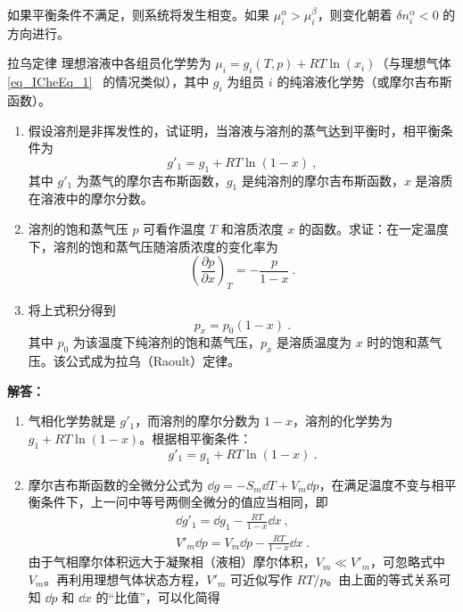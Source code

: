 如果平衡条件不满足，则系统将发生相变。如果 $\mu_i^\alpha>\mu_i^\beta$，则变化朝着 $\delta n_i^\alpha<0$ 的方向进行。

\begin{example}{拉乌定律}
理想溶液中各组员化学势为 $\mu_i=g_i(T,p)+RT\ln(x_i)$（与理想气体 \autoref{eq_ICheEq_1}~ 的情况类似），其中 $g_i$ 为组员 $i$ 的纯溶液化学势（或摩尔吉布斯函数）。
\begin{enumerate}
\item 假设溶剂是非挥发性的，试证明，当溶液与溶剂的蒸气达到平衡时，相平衡条件为
\begin{equation}
g'_1=g_1+RT\ln(1-x)~,
\end{equation}
其中 $g'_1$ 为蒸气的摩尔吉布斯函数，$g_1$ 是纯溶剂的摩尔吉布斯函数，$x$ 是溶质在溶液中的摩尔分数。
\item 溶剂的饱和蒸气压 $p$ 可看作温度 $T$ 和溶质浓度 $x$ 的函数。求证：在一定温度下，溶剂的饱和蒸气压随溶质浓度的变化率为
\begin{equation}
\left(\frac{\partial p}{\partial x}\right)_T=-\frac{p}{1-x}~.
\end{equation}
\item 将上式积分得到
\begin{equation}
p_x=p_0(1-x)~.
\end{equation}
其中 $p_0$ 为该温度下纯溶剂的饱和蒸气压，$p_x$ 是溶质温度为 $x$ 时的饱和蒸气压。该公式成为拉乌（Raoult）定律。
\end{enumerate}
\textbf{解答：}
\begin{enumerate}
\item 气相化学势就是 $g'_1$，而溶剂的摩尔分数为 $1-x$，溶剂的化学势为$g_1+RT\ln(1-x)$。根据相平衡条件：
\begin{equation}
g'_1=g_1+RT\ln(1-x)~.
\end{equation}
\item 摩尔吉布斯函数的全微分公式为 $\dd g=-S_m\dd T+V_m\dd p$，在满足温度不变与相平衡条件下，上一问中等号两侧全微分的值应当相同，即
\begin{equation}
\begin{aligned}
\dd g'_1=\dd g_1-\frac{RT}{1-x}\dd x~,\\
V'_m\dd p=V_m\dd p-\frac{RT}{1-x}\dd x~.
\end{aligned}
\end{equation}
由于气相摩尔体积远大于凝聚相（液相）摩尔体积，$V_m\ll V'_m$，可忽略式中 $V_m$。再利用理想气体状态方程，$V'_m$ 可近似写作 $RT/p$。由上面的等式关系可知 $\dd p$ 和 $\dd x$ 的“比值”，可以化简得
\begin{equation}

\end{equation}
\end{enumerate}
\end{example}
